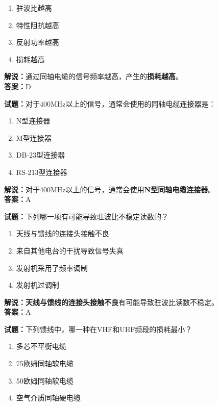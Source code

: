 \documentclass{ctexbook}
\begin{document}
\begin{enumerate}[leftmargin=3em]
  \item 驻波比越高
  \item 特性阻抗越高
  \item 反射功率越高
  \item 损耗越高
\end{enumerate}

\noindent\textbf{解说：}通过同轴电缆的信号频率越高，产生的\textbf{损耗越高}。\\\noindent\textbf{答案：}D

\bigskip

\noindent\textbf{试题：}对于400\si{\MHz}以上的信号，通常会使用的同轴电缆连接器是：

\begin{enumerate}[leftmargin=3em]
  \item N型连接器
  \item M型连接器
  \item DB-23型连接器
  \item RS-213型连接器
\end{enumerate}

\noindent\textbf{解说：}对于400\si{\MHz}以上的信号，通常会使用\textbf{N型同轴电缆连接器}。\\\noindent\textbf{答案：}A

\bigskip

\noindent\textbf{试题：}下列哪一项有可能导致驻波比不稳定读数的？

\begin{enumerate}[leftmargin=3em]
  \item 天线与馈线的连接头接触不良
  \item 来自其他电台的干扰导致信号失真
  \item 发射机采用了频率调制
  \item 发射机过调制
\end{enumerate}

\noindent\textbf{解说：}\textbf{天线与馈线的连接头接触不良}有可能导致驻波比读数不稳定。\\\noindent\textbf{答案：}A

\bigskip

\noindent\textbf{试题：}下列馈线中，哪一种在VHF和UHF频段的损耗最小？

\begin{enumerate}[leftmargin=3em]
  \item 多芯不平衡电缆
  \item 75欧姆同轴软电缆
  \item 50欧姆同轴软电缆
  \item 空气介质同轴硬电缆
\end{enumerate}
\end{document}

